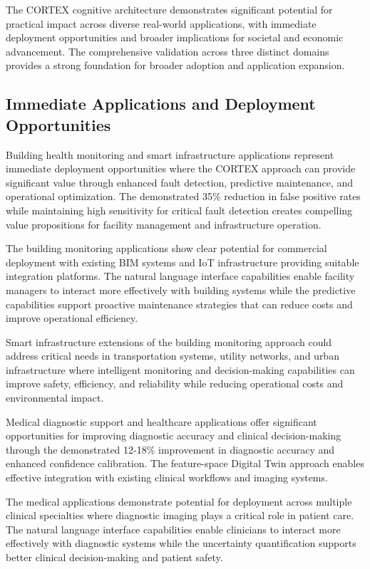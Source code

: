 The CORTEX cognitive architecture demonstrates significant potential for practical impact across diverse real-world applications, with immediate deployment opportunities and broader implications for societal and economic advancement. The comprehensive validation across three distinct domains provides a strong foundation for broader adoption and application expansion.

\subsection{Immediate Applications and Deployment Opportunities}

Building health monitoring and smart infrastructure applications represent immediate deployment opportunities where the CORTEX approach can provide significant value through enhanced fault detection, predictive maintenance, and operational optimization. The demonstrated 35\% reduction in false positive rates while maintaining high sensitivity for critical fault detection creates compelling value propositions for facility management and infrastructure operation.

The building monitoring applications show clear potential for commercial deployment with existing BIM systems and IoT infrastructure providing suitable integration platforms. The natural language interface capabilities enable facility managers to interact more effectively with building systems while the predictive capabilities support proactive maintenance strategies that can reduce costs and improve operational efficiency.

Smart infrastructure extensions of the building monitoring approach could address critical needs in transportation systems, utility networks, and urban infrastructure where intelligent monitoring and decision-making capabilities can improve safety, efficiency, and reliability while reducing operational costs and environmental impact.

Medical diagnostic support and healthcare applications offer significant opportunities for improving diagnostic accuracy and clinical decision-making through the demonstrated 12-18\% improvement in diagnostic accuracy and enhanced confidence calibration. The feature-space Digital Twin approach enables effective integration with existing clinical workflows and imaging systems.

The medical applications demonstrate potential for deployment across multiple clinical specialties where diagnostic imaging plays a critical role in patient care. The natural language interface capabilities enable clinicians to interact more effectively with diagnostic systems while the uncertainty quantification supports better clinical decision-making and patient safety.

